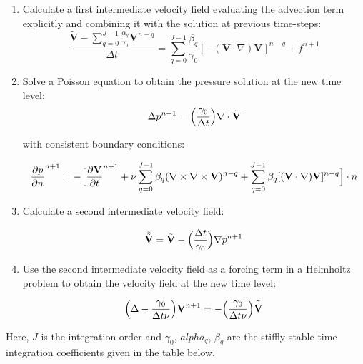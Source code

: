 \begin{enumerate}
\item Calculate a first intermediate velocity field evaluating the advection term explicitly and combining it with the solution at previous time-steps:
\begin{equation}
 \frac{\tilde{\mathbf{V}}-\sum_{q=0}^{J-1}\frac{\alpha_q}{\gamma_0}\mathbf{V}^{n-q}}{\Delta t}=\sum_{q=0}^{J-1}\frac{\beta_q}{\gamma_0}[-(\mathbf{V}\cdot\nabla)\mathbf{V}]^{n-q} + f^{n+1}\end{equation}

 \item Solve a Poisson equation to obtain the pressure solution at the new time level:
 \begin{equation}
  \Delta p^{n+1}=\Bigl(\frac{\gamma_0}{\Delta t}\Bigr)\nabla\cdot\tilde{\mathbf{V}}
 \end{equation}

with consistent boundary conditions:

\begin{equation}
 \frac{\partial p}{\partial n}^{n+1}= - \Bigl[ \frac{\partial \mathbf{V}}{\partial t}^{n+1} + \nu \sum_{q=0}^{J-1}\beta_q(\nabla \times \nabla \times   \mathbf{V})^{n-q} + \sum_{q=0}^{J-1}\beta_q [(\mathbf{V} \cdot \nabla)\mathbf{V}]^{n-q}\Bigr]\cdot n
\end{equation}


\item  Calculate a second intermediate velocity field:

\begin{equation}
 \tilde{\tilde{\mathbf{V}}}=\tilde{\mathbf{V}}-\Bigl(\frac{\Delta t}{\gamma_0}\Bigr)\nabla p^{n+1}
\end{equation}

 \item Use the second intermediate velocity field as a forcing term in a Helmholtz problem to obtain the velocity field at the new time level:

 \begin{equation}
  \Bigl(\Delta-\frac{\gamma_0}{\Delta t \nu}\Bigr)\mathbf{V}^{n+1}=-\Bigl(\frac{\gamma_0}{\Delta t \nu}\Bigr)\tilde{\tilde{\mathbf{V}}}
 \end{equation}

 \end{enumerate}

Here, $J$ is the integration order and $\gamma_0$, $alpha_q$, $\beta_q$
are the stiffly stable time integration coefficients given in the table below.

